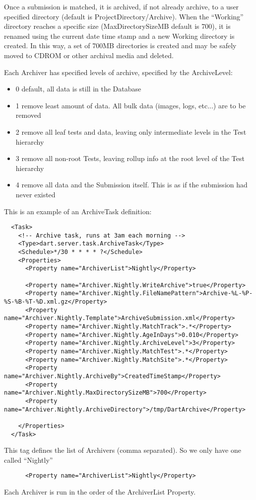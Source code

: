 \documentclass{InsightBook}
\begin{document}
Once a submission is matched, it is archived, if not already archive, to a user specified directory (default is ProjectDirectory/Archive).  When the ``Working'' directory reaches a specific size (MaxDirectorySizeMB default is 700), it is renamed using the current date time stamp and a new Working directory is created.  In this way, a set of 700MB directories is created and may be safely moved to CDROM or other archival media and deleted.

Each Archiver has specified levels of archive, specified by the ArchiveLevel:

\begin{itemize}
\item 0 default, all data is still in the Database
\item 1 remove least amount of data.  All bulk data (images, logs, etc...) are to be removed
\item 2 remove all leaf tests and data, leaving only intermediate levels in the Test hierarchy
\item 3 remove all non-root Tests, leaving rollup info at the root level of the Test hierarchy
\item 4 remove all data and the Submission itself.  This is as if the submission had never existed
\end{itemize}

This is an example of an ArchiveTask definition:
\begin{verbatim}
  <Task>
    <!-- Archive task, runs at 3am each morning -->
    <Type>dart.server.task.ArchiveTask</Type>
    <Schedule>*/30 * * * * ?</Schedule>
    <Properties>
      <Property name="ArchiverList">Nightly</Property>

      <Property name="Archiver.Nightly.WriteArchive">true</Property>
      <Property name="Archiver.Nightly.FileNamePattern">Archive-%L-%P-%S-%B-%T-%D.xml.gz</Property>
      <Property name="Archiver.Nightly.Template">ArchiveSubmission.xml</Property>
      <Property name="Archiver.Nightly.MatchTrack">.*</Property>
      <Property name="Archiver.Nightly.AgeInDays">0.010</Property>
      <Property name="Archiver.Nightly.ArchiveLevel">3</Property>
      <Property name="Archiver.Nightly.MatchTest">.*</Property>
      <Property name="Archiver.Nightly.MatchSite">.*</Property>
      <Property name="Archiver.Nightly.ArchiveBy">CreatedTimeStamp</Property>
      <Property name="Archiver.Nightly.MaxDirectorySizeMB">700</Property>
      <Property name="Archiver.Nightly.ArchiveDirectory">/tmp/DartArchive</Property>
      
    </Properties>
  </Task>
\end{verbatim}
This tag defines the list of Archivers (comma separated).  So we only
have one called ``Nightly''
\begin{verbatim}
      <Property name="ArchiverList">Nightly</Property>
\end{verbatim}
Each Archiver is run in the order of the ArchiverList Property.
\end{document}
